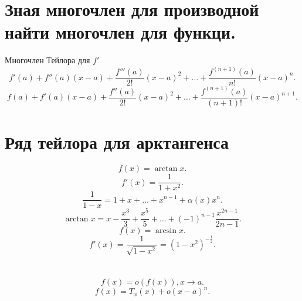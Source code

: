 \documentclass[a4paper]{scrartcl}
\begin{document}
    \section{Зная многочлен для производной найти многочлен для функци.}
    Многочлен Тейлора для $f'$
    \[
        f'(a) + f''(a)(x - a) + \frac{f'''(a)}{2!}(x - a)^2 + \dots + \frac{f^{(n + 1)}(a)}{n!} (x - a)^n
    .\] 
    \[
        f(a) + f'(a)(x - a) + \frac{f''(a)}{2!} (x - a)^2 + \dots + \frac{f^{(n + 1)}(a)}{(n+1)!} (x - a)^{n + 1}
    .\] 
    \section{Ряд тейлора для арктангенса}
    \[
        f(x) = \arctan{x}
    .\] 
    \[
    f'(x) = \frac{1}{1 + x^2}
    .\] 
    \[
        \frac{1}{1 - x} = 1 + x + \dots + x^{n - 1} + \alpha(x)x^n
    .\] 
    \[
        \arctan{x} =  x - \frac{x^3}{3} + \frac{x^5}{5} + \dots + (-1)^{n-1} \frac{x^{2n - 1}}{2n - 1}
    .\] 
    \[
        f(x) = \arcsin{x}
    .\] 
    \[
        f'(x) = \frac{1}{\sqrt{1 - x^2}} = (1 - x^2)^{-\frac{1}{2}}
    .\] 
    \section{}
    \[
    f(x) =  o(f(x)), x \to a
    .\] 
    \[
    f(x)  = T_x(x) + o(x-a)^n
    .\] 
\end{document}
